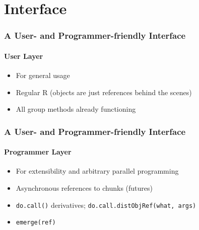 \documentclass[handout]{beamer}
\begin{document}
\section{Interface}
	\begin{frame}
		\frametitle{A User- and Programmer-friendly Interface}
		\framesubtitle{User Layer}
		\begin{itemize}
			\item For general usage
			\item Regular R (objects are just references behind the scenes)
			\item All group methods already functioning
		\end{itemize}
	\end{frame}
	\begin{frame}
		\frametitle{A User- and Programmer-friendly Interface}
		\framesubtitle{Programmer Layer}
		\begin{itemize}
			\item For extensibility and arbitrary parallel programming
			\item Asynchronous references to chunks (futures)
			\item \texttt{do.call()} derivatives;
				\texttt{do.call.distObjRef(what, args)}
			\item \texttt{emerge(ref)}
		\end{itemize}
	\end{frame}
\end{document}
